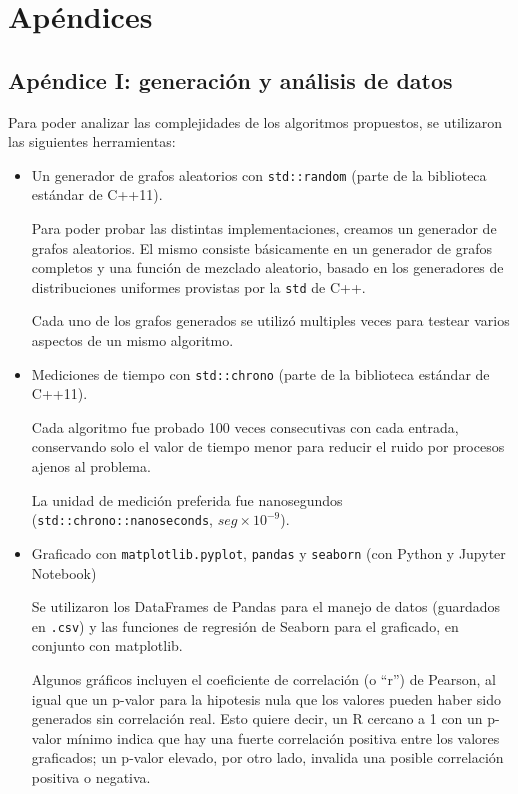 \section{Apéndices}
	\subsection{Apéndice I: generación y análisis de datos}

	Para poder analizar las complejidades de los algoritmos propuestos, se utilizaron las siguientes herramientas:

	\begin{itemize}
		\item Un generador de grafos aleatorios con \texttt{std::random} (parte de la biblioteca estándar de C++11).

		Para poder probar las distintas implementaciones, creamos un generador de grafos aleatorios. El mismo consiste básicamente en un generador de grafos completos y una función de mezclado aleatorio, basado en los generadores de distribuciones uniformes provistas por la \texttt{std} de C++.

		Cada uno de los grafos generados se utilizó multiples veces para testear varios aspectos de un mismo algoritmo.

		\item Mediciones de tiempo con \texttt{std::chrono} (parte de la biblioteca estándar de C++11).

		Cada algoritmo fue probado 100 veces consecutivas con cada entrada, conservando solo el valor de tiempo menor para reducir el ruido por procesos ajenos al problema.

		La unidad de medición preferida fue nanosegundos (\texttt{std::chrono::nanoseconds}, $seg \times 10^{-9}$).

		\item Graficado con \texttt{matplotlib.pyplot}, \texttt{pandas} y \texttt{seaborn} (con Python y Jupyter Notebook)

		Se utilizaron los DataFrames de Pandas para el manejo de datos (guardados en \texttt{.csv}) y las funciones de regresión de Seaborn para el graficado, en conjunto con matplotlib.

		Algunos gráficos incluyen el coeficiente de correlación (o ``r'') de Pearson, al igual que un p-valor para la hipotesis nula que los valores pueden haber sido generados sin correlación real. Esto quiere decir, un R cercano a 1 con un p-valor mínimo indica que hay una fuerte correlación positiva entre los valores graficados; un p-valor elevado, por otro lado, invalida una posible correlación positiva o negativa.

	\end{itemize}

